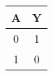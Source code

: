 \documentclass{subfiles}
\begin{document}
\begin{figure*}[h!]
    \centering
    \begin{tabular}{c|c}
        A & Y \\
        \hline
        0 & 1 \\
        1 & 0
    \end{tabular}
\end{figure*}
\end{document}
